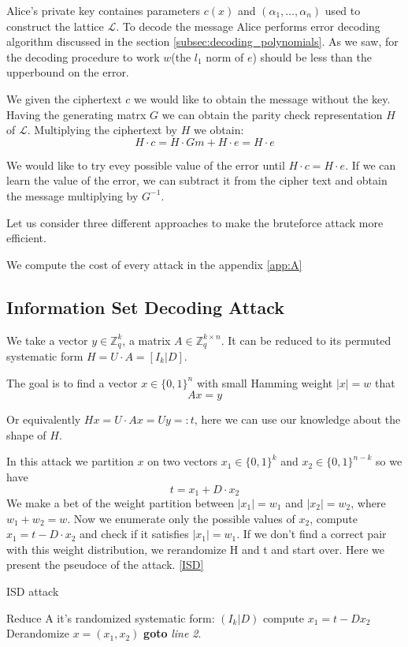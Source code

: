 \documentclass[12pt]{article}
\newcommand{\ZZ}{\mathbb{Z}}
\newcommand{\LL}{\mathcal{L}}
\begin{document}
Alice's private key containes parameters $c(x)$ and $(\alpha_1, \dots, \alpha_n)$ used to construct the lattice $\LL$. To decode the message Alice performs error decoding algorithm discussed in the section \ref{subsec:decoding_polynomials}. As we saw, for the decoding procedure to work $w$(the $l_1$ norm of $e$) should be less than the upperbound on the error.

We given the ciphertext $c$ we would like to obtain the message without the key. Having the generating matrx $G$ we can obtain the parity check representation $H$ of $\LL$. Multiplying the ciphertext by $H$ we obtain:
\[
    H \cdot c = H \cdot Gm + H \cdot e = H \cdot e
\]

We would like to try evey possible value of the error until $H \cdot c = H \cdot e$. If we can learn the value of the error, we can subtract it from the cipher text and obtain the message multiplying by $G^{-1}$.

Let us consider three different approaches to make the bruteforce attack more efficient.

We compute the cost of every attack in the appendix \ref{app:A}


\subsection{Information Set Decoding Attack}

We take a vector $y \in \ZZ_q^{k}$, a matrix $A \in \ZZ_q^{k \times n}$. It can be reduced to its permuted systematic form $H  = U \cdot A = [I_{k}|D]$.


The goal is to find a vector $x \in \{0,1\}^{n}$ with small Hamming weight $|x| = w$ that
\[
Ax = y
\]

Or equivalently $Hx = U\cdot Ax = Uy =: t$, here we can use our knowledge about the shape of $H$.

In this attack we partition $x$ on two vectors $x_1 \in \{0,1\}^{k}$ and  $x_2  \in \{0,1\}^{n-k}$ so we have
\[
t = x_1 + D \cdot x_2
\]
We make a bet of the weight partition between $|x_1| = w_1$ and $|x_2| = w_2$, where $w_1 + w_2 = w$. Now we enumerate only the possible values of $x_2$, compute $x_1 = t - D \cdot x_2$ and check if it satisfies $|x_1| = w_1$. If we don't find a correct pair with this weight distribution, we rerandomize H and t and start over. Here we present the pseudoce of the attack. \ref{ISD}
\begin{algorithm}
\caption{ISD attack}\label{ISD}
\begin{algorithmic}[1]
    \State Reduce A it's randomized systematic form: $(I_k |D)$
        \State compute $x_1 = t - Dx_2$
        \State \Return Derandomize $x = (x_1, x_2)$
        \EndIf
    \EndFor
\State \textbf{goto} \emph{line 2}.
\EndProcedure
\end{algorithmic}
\end{algorithm}
\end{document}
